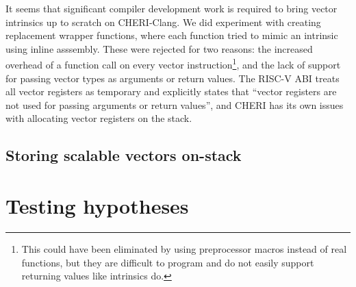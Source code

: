 It seems that significant compiler development work is required to bring vector intrinsics up to scratch on CHERI-Clang.
We did experiment with creating replacement wrapper functions, where each function tried to mimic an intrinsic using inline asssembly.
These were rejected for two reasons: the increased overhead of a function call on every vector instruction\footnote{This could have been eliminated by using preprocessor macros instead of real functions, but they are difficult to program and do not easily support returning values like intrinsics do.}, and the lack of support for passing vector types as arguments or return values.
The RISC-V ABI treats all vector registers as temporary and explicitly states that \enquote{vector registers are not used for passing arguments or return values}, and CHERI has its own issues with allocating vector registers on the stack.

\subsection{Storing scalable vectors on-stack}

\pagebreak
\section{Testing hypotheses}




